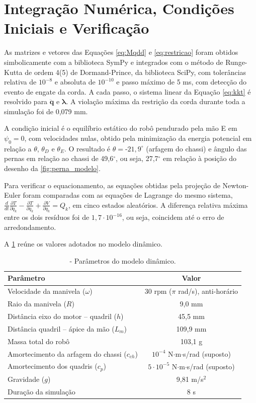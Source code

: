 \section{Integração Numérica, Condições Iniciais e Verificação}
\label{sec:numerica}

As matrizes e vetores das Equações \ref{eq:Mqdd} e \ref{eq:restricao} foram obtidos simbolicamente com a biblioteca SymPy e integrados com o método de Runge-Kutta de ordem 4(5) de Dormand-Prince, da biblioteca SciPy, com tolerâncias relativa de $10^{-8}$ e absoluta de $10^{-10}$ e passo máximo de 5 ms, com detecção do evento de engate da corda. A cada passo, o sistema linear da Equação \ref{eq:kkt} é resolvido para $\ddot{\mathbf q}$ e $\boldsymbol\lambda$. A violação máxima da restrição da corda durante toda a simulação foi de 0,079 mm.

A condição inicial é o equilíbrio estático do robô pendurado pela mão E em $\psi_0=0$, com velocidades nulas, obtido pela minimização da energia potencial em relação a $\theta$, $\theta_D$ e $\theta_E$. O resultado é $\theta=$-$21,9^\circ$ (arfagem do chassi) e ângulo das pernas em relação ao chassi de 49,6$^\circ$, ou seja, 27,7$^\circ$ em relação à posição do desenho da \ref{fig:perna_modelo}.

Para verificar o equacionamento, as equações obtidas pela projeção de Newton-Euler foram comparadas com as equações de Lagrange do mesmo sistema, $\frac{d}{dt}\frac{\partial T}{\partial\dot q_k}-\frac{\partial T}{\partial q_k}+\frac{\partial V}{\partial q_k}=Q_k$, em cinco estados aleatórios. A diferença relativa máxima entre os dois resíduos foi de $1{,}7\cdot 10^{-16}$, ou seja, coincidem até o erro de arredondamento.

A \ref{tab:param_dyn} reúne os valores adotados no modelo dinâmico.

\begin{table}[H]
\centering
\caption{\label{tab:param_dyn}- Parâmetros do modelo dinâmico.}
\vspace*{.1cm}
\begin{tabular}{|l|c|}
\hline
\textbf{Parâmetro} & \textbf{Valor} \\
\hline
Velocidade da manivela ($\omega$) & 30 rpm ($\pi$ rad/s), anti-horário \\
\hline
Raio da manivela ($R$) & 9,0 mm \\
\hline
Distância eixo do motor -- quadril ($h$) & 45,5 mm \\
\hline
Distância quadril -- ápice da mão ($L_m$) & 109,9 mm \\
\hline
Massa total do robô & 103,1 g \\
\hline
Amortecimento da arfagem do chassi ($c_{ch}$) & $10^{-4}$ N$\cdot$m$\cdot$s/rad (suposto) \\
\hline
Amortecimento dos quadris ($c_{p}$) & $5\cdot 10^{-5}$ N$\cdot$m$\cdot$s/rad (suposto) \\
\hline
Gravidade ($g$) & 9,81 m/s$^2$ \\
\hline
Duração da simulação & 8 s \\
\hline
\end{tabular}
\end{table}
